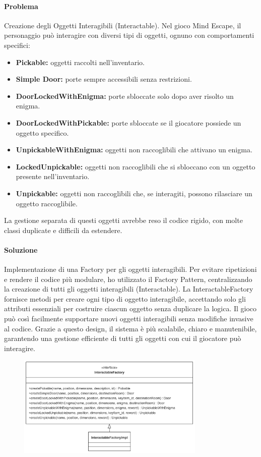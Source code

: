 \documentclass[a4paper,12pt]{report}
\begin{document}
\paragraph{Problema} %
Creazione degli Oggetti Interagibili (Interactable).
Nel gioco Mind Escape, il personaggio può interagire con diversi tipi di oggetti, ognuno con comportamenti specifici:
\begin{itemize}
	\item \textbf{Pickable:} oggetti raccolti nell'inventario.
	\item \textbf{Simple Door:} porte sempre accessibili senza restrizioni.
	\item \textbf{DoorLockedWithEnigma:} porte sbloccate solo dopo aver risolto un enigma.
	\item \textbf{DoorLockedWithPickable:} porte sbloccate se il giocatore possiede un oggetto specifico.
	\item \textbf{UnpickableWithEnigma:} oggetti non raccoglibili che attivano un enigma.
	\item \textbf{LockedUnpickable:} oggetti non raccoglibili che si sbloccano con un oggetto presente nell'inventario.
	\item \textbf{Unpickable:} oggetti non raccoglibili che, se interagiti, possono rilasciare un oggetto raccoglibile.
\end{itemize}
La gestione separata di questi oggetti avrebbe reso il codice rigido, con molte classi duplicate e difficili da estendere.
\paragraph{Soluzione} %
Implementazione di una Factory per gli oggetti interagibili.
Per evitare ripetizioni e rendere il codice più modulare, ho utilizzato il Factory Pattern, centralizzando la creazione di tutti gli oggetti interagibili (Interactable). La InteractableFactory fornisce metodi per creare ogni tipo di oggetto interagibile, accettando solo gli attributi essenziali per costruire ciascun oggetto senza duplicare la logica.
Il gioco può così facilmente supportare nuovi oggetti interagibili senza modifiche invasive al codice.
Grazie a questo design, il sistema è più scalabile, chiaro e manutenibile, garantendo una gestione efficiente di tutti gli oggetti con cui il giocatore può interagire.
\begin{figure}[h]
    \centering
    \includegraphics[width=0.8\textwidth]{img/interactableFactory.png}
    \label{img:interactableFactory}
\end{figure}
\end{document}
